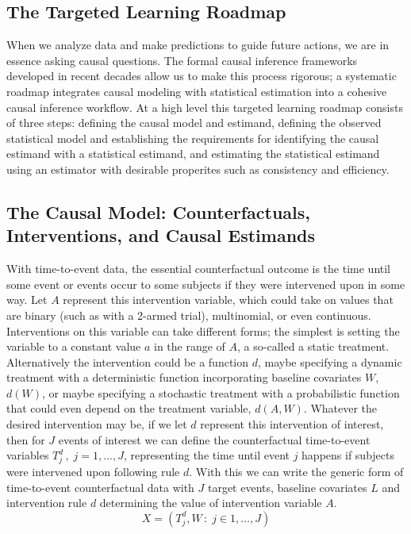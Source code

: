 \documentclass{report}
\newcommand{\1}{\ensuremath{\mathbf{1}}}
\renewcommand{\L}{\ensuremath{W}}
\begin{document}
\subsection{The Targeted Learning Roadmap}
\label{sec:org7ce2d98}
When we analyze data and make predictions to guide future actions, we are in essence asking causal questions. The formal causal inference frameworks developed in recent decades allow us to make this process rigorous; a systematic roadmap \cite{petersen_causal_2014} integrates causal modeling with statistical estimation into a cohesive causal inference workflow. At a high level this targeted learning roadmap consists of three steps: defining the causal model and estimand, defining the observed statistical model and establishing the requirements for identifying the causal estimand with a statistical estimand, and estimating the statistical estimand using an estimator with desirable properites such as consistency and efficiency.

\subsection{The Causal Model: Counterfactuals, Interventions, and Causal Estimands}
\label{sec:orgd100942}
With time-to-event data, the essential counterfactual outcome is the time until some event or events occur to some subjects if they were intervened upon in some way. Let \(A\) represent this intervention variable, which could take on values that are binary (such as with a 2-armed trial), multinomial, or even continuous. Interventions on this variable can take different forms; the simplest is setting the variable to a constant value \(a\) in the range of \(A\), a so-called a static treatment. Alternatively the intervention could be a function \(d\), maybe specifying a dynamic treatment with a deterministic function incorporating baseline covariates \(\L\), \(d(\L)\), or maybe specifying a stochastic treatment with a probabilistic function that could even depend on the treatment variable, \(d(A, \L)\). Whatever the desired intervention may be, if we let \(d\) represent this intervention of interest, then for \(J\) events of interest we can define the counterfactual time-to-event variables \(T^d_j \,,\; j = 1, ..., J\), representing the time until event \(j\) happens if subjects were intervened upon following rule \(d\). With this we can write the generic form of time-to-event counterfactual data with \(J\) target events, baseline covariates \(L\) and intervention rule \(d\) determining the value of intervention variable \(A\).
\[ X = \left( T^d_j, \L \,:\; j \in 1, \dots, J \right)\]
\end{document}
